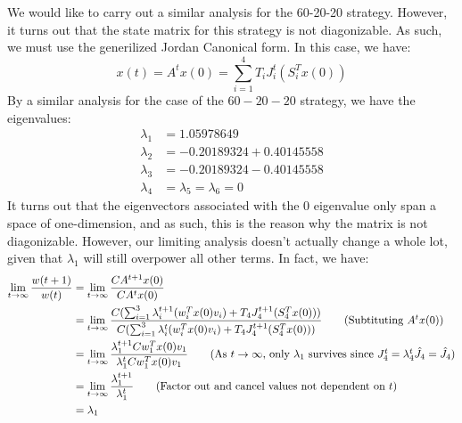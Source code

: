 \documentclass[12pt]{exam}
\begin{document}
\begin{questions}
\begin{solution}
\begin{enumerate}[label=(\alph*)]
      We would like to carry out a similar analysis for the 60-20-20 strategy. However, it turns out that the state matrix for this strategy is not diagonizable. As such, we must use the generilized Jordan Canonical form. In this case, we have:
      \[
        x(t) = A^tx(0) = \sum_{i=1}^4 T_iJ_i^t(S_i^Tx(0)) \tag{$A$ is not-diagonalize for 60-20-20 strategy}
      \]
      By a similar analysis for the case of the $60-20-20$ strategy, we have the eigenvalues:
      \begin{align*}
        \lambda_1 &= 1.05978649 \\
        \lambda_2 &= -0.20189324 + 0.40145558 \\
        \lambda_3 &=  -0.20189324 - 0.40145558 \\
        \lambda_4 &= \lambda_5 = \lambda_6 = 0 
      \end{align*}
      It turns out that the eigenvectors associated with the $0$ eigenvalue only span a space of one-dimension, and as such, this is the reason why the matrix is not diagonizable. However, our limiting analysis doesn't actually change a whole lot, given that $\lambda_1$ will still overpower all other terms. In fact, we have:
      \begin{align*}
        \lim_{t \to \infty} \frac{w(t+1)}{w(t)} &= \lim_{t \to \infty} \frac{CA^{t+1}x(0)}{CA^tx(0)} \\
        &= \lim_{t \to \infty} \frac{C( \sum_{i=1}^3 \lambda_i^{t+1}(w_i^Tx(0)v_i) + T_4J_4^{t+1}(S_4^Tx(0)))}{C(\sum_{i=1}^3 \lambda_i^t(w_i^Tx(0)v_i) + T_4J_4^{t+1}(S_4^Tx(0)))} \tag{Subtituting $A^tx(0)$} \\
        &=\lim_{t \to \infty} \frac{\lambda_1^{t+1}Cw_1^Tx(0)v_1 }{\lambda_1^{t}Cw_1^Tx(0)v_1}  \tag{As $t \to \infty$, only $\lambda_1$ survives since $J_4^t = \lambda_4^t\hat{J_4} = \hat{J_4}$} \\
        &= \lim_{t \to \infty} \frac{\lambda_1^{t+1}}{\lambda_1^{t}} \tag{Factor out and cancel values not dependent on $t$} \\
        &= \lambda_1
      \end{align*}


\end{enumerate}
\end{solution}
\end{questions}
\end{document}
